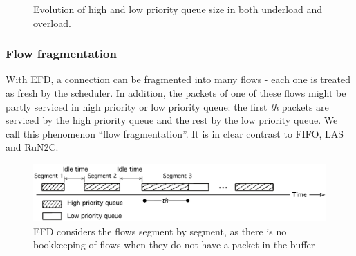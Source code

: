 \documentclass[preprint,12pt]{elsarticle}
\begin{document}
\begin{figure}[ht]
  \centering
  \caption{Evolution of high and low priority queue size  in both underload and overload.}
  \label{fig:queue_evo}
\end{figure}


\subsubsection{Flow fragmentation} \label{sec:fragmentation}

With EFD, a connection can be fragmented into many flows - each one is treated as fresh by the scheduler. In addition, the packets of one of these flows might be partly serviced in high priority or low priority queue: the first \textit{th} packets are serviced by the high priority queue and the rest by the low priority queue. We call this phenomenon ``flow fragmentation''. It is in clear contrast to FIFO, LAS and RuN2C.

\begin{figure}[ht]%
   \centering
   \includegraphics[width=0.7\hsize]{./fig/flow-split}%
   \caption{EFD considers the flows segment by segment, as there is no bookkeeping of flows when they do not have a packet in the buffer}
   \label{fig:flow-split}
\end{figure}
\end{document}
